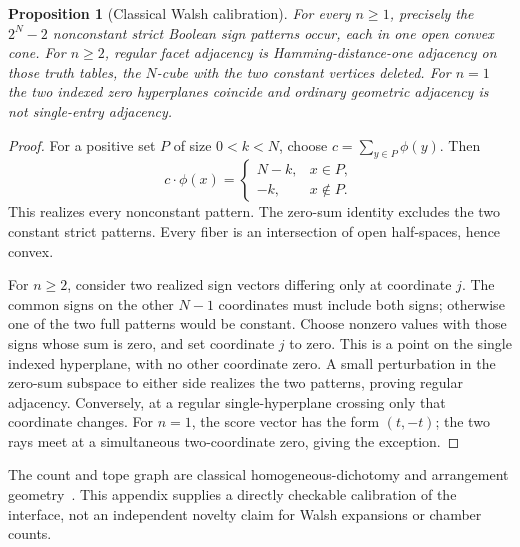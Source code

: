 \documentclass[11pt]{article}
\newtheorem{proposition}[theorem]{Proposition}
\theoremstyle{definition}
\theoremstyle{remark}
\begin{document}
\begin{proposition}[Classical Walsh calibration]\label{prop:walsh}
For every $n\ge1$, precisely the $2^N-2$ nonconstant strict Boolean sign patterns occur, each in one open convex cone. For $n\ge2$, regular facet adjacency is Hamming-distance-one adjacency on those truth tables, the $N$-cube with the two constant vertices deleted. For $n=1$ the two indexed zero hyperplanes coincide and ordinary geometric adjacency is not single-entry adjacency.
\end{proposition}
\begin{proof}
For a positive set $P$ of size $0<k<N$, choose $c=\sum_{y\in P}\phi(y)$. Then
\[
 c\cdot\phi(x)=\begin{cases}N-k,&x\in P,\\-k,&x\notin P.\end{cases}
\]
This realizes every nonconstant pattern. The zero-sum identity excludes the two constant strict patterns. Every fiber is an intersection of open half-spaces, hence convex.

For $n\ge2$, consider two realized sign vectors differing only at coordinate $j$. The common signs on the other $N-1$ coordinates must include both signs; otherwise one of the two full patterns would be constant. Choose nonzero values with those signs whose sum is zero, and set coordinate $j$ to zero. This is a point on the single indexed hyperplane, with no other coordinate zero. A small perturbation in the zero-sum subspace to either side realizes the two patterns, proving regular adjacency. Conversely, at a regular single-hyperplane crossing only that coordinate changes. For $n=1$, the score vector has the form $(t,-t)$; the two rays meet at a simultaneous two-coordinate zero, giving the exception.
\end{proof}
The count and tope graph are classical homogeneous-dichotomy and arrangement geometry~\cite{Cover1965,Bjorner1999}. This appendix supplies a directly checkable calibration of the interface, not an independent novelty claim for Walsh expansions or chamber counts.
\end{document}
